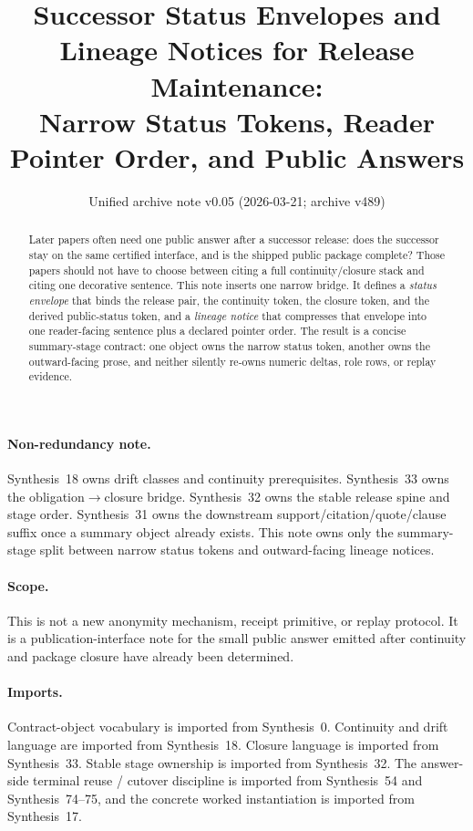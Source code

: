 \documentclass[11pt]{article}
\title{Successor Status Envelopes and Lineage Notices for Release Maintenance:\\[0.5ex]
\large Narrow Status Tokens, Reader Pointer Order, and Public Answers}
\author{}
\date{Unified archive note v0.05 (2026-03-21; archive v489)}
\begin{document}
\maketitle

\begin{abstract}
Later papers often need one public answer after a successor release: does the successor stay on the same certified interface, and is the shipped public package complete?
Those papers should not have to choose between citing a full continuity/closure stack and citing one decorative sentence.
This note inserts one narrow bridge.
It defines a \emph{status envelope} that binds the release pair, the continuity token, the closure token, and the derived public-status token, and a \emph{lineage notice} that compresses that envelope into one reader-facing sentence plus a declared pointer order.
The result is a concise summary-stage contract: one object owns the narrow status token, another owns the outward-facing prose, and neither silently re-owns numeric deltas, role rows, or replay evidence.
\end{abstract}

\paragraph{Non-redundancy note.}
Synthesis~18 owns drift classes and continuity prerequisites.\cite{series:planstateequiv}
Synthesis~33 owns the obligation$\to$closure bridge.\cite{series:releaseclosure}
Synthesis~32 owns the stable release spine and stage order.\cite{series:releasespine}
Synthesis~31 owns the downstream support/citation/quote/clause suffix once a summary object already exists.\cite{series:downstreamnormalforms}
This note owns only the summary-stage split between narrow status tokens and outward-facing lineage notices.

\paragraph{Scope.}
This is not a new anonymity mechanism, receipt primitive, or replay protocol.
It is a publication-interface note for the small public answer emitted after continuity and package closure have already been determined.

\paragraph{Imports.}
Contract-object vocabulary is imported from Synthesis~0.\cite{series:contractobjects}
Continuity and drift language are imported from Synthesis~18.\cite{series:planstateequiv}
Closure language is imported from Synthesis~33.\cite{series:releaseclosure}
Stable stage ownership is imported from Synthesis~32.\cite{series:releasespine}
The answer-side terminal reuse / cutover discipline is imported from Synthesis~54 and Synthesis~74--75, and the concrete worked instantiation is imported from Synthesis~17.\cite{series:challengeanswerreviewmenus,series:pairedterminalcitationdiscipline,series:pairedterminalcutoverrules,series:workedexample}
\end{document}
